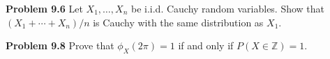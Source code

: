 \textbf{Problem 9.6} Let $X_1,\ldots,X_n$ be i.i.d. Cauchy random variables. Show that $(X_1+\cdots+X_n)/n$ is Cauchy with the same distribution as $X_1$.

\textbf{Problem 9.8} Prove that $\phi_X(2\pi)=1$ if and only if $P(X\in\mathbb{Z})=1$.
